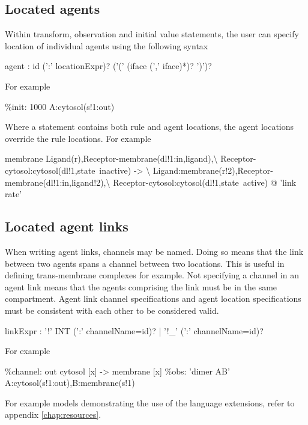 \subsection{Located agents}

Within transform, observation and initial value statements, the user can specify location of individual agents using the following syntax
\begin{bnfsource}
agent :
  id (':' locationExpr)? ('(' (iface (',' iface)*)? ')')?
\end{bnfsource}
For example
\begin{kappasource}
\%init: 1000 A:cytosol(s!1:out)
\end{kappasource}

Where a statement contains both rule and agent locations, the agent locations override the rule locations. For example
\begin{kappasource}
membrane Ligand(r),Receptor-membrane(dl!1:in,ligand),{\textbackslash}
    Receptor-cytosol:cytosol(dl!1,state~inactive) -> {\textbackslash}
    Ligand:membrane(r!2),Receptor-membrane(dl!1:in,ligand!2),{\textbackslash}
    Receptor-cytosol:cytosol(dl!1,state~active) @ 'link rate'
\end{kappasource}

\subsection{Located agent links}

When writing agent links, channels may be named. Doing so means that the link between two agents spans a channel between two locations. This is useful in defining trans-membrane complexes for example. Not specifying a channel in an agent link means that the agents comprising the link must be in the same compartment. Agent link channel specifications and agent location specifications must be consistent with each other to be considered valid.

\begin{bnfsource}
linkExpr :
  '!' INT (':' channelName=id)?
  | '!_' (':' channelName=id)?
\end{bnfsource}
For example
\begin{kappasource}
\%channel: out cytosol [x] -> membrane [x]
\%obs: 'dimer AB' A:cytosol(s!1:out),B:membrane(s!1) 
\end{kappasource}


\bigskip For example models demonstrating the use of the language extensions, refer to appendix \ref{chap:resources}.

\newpage

